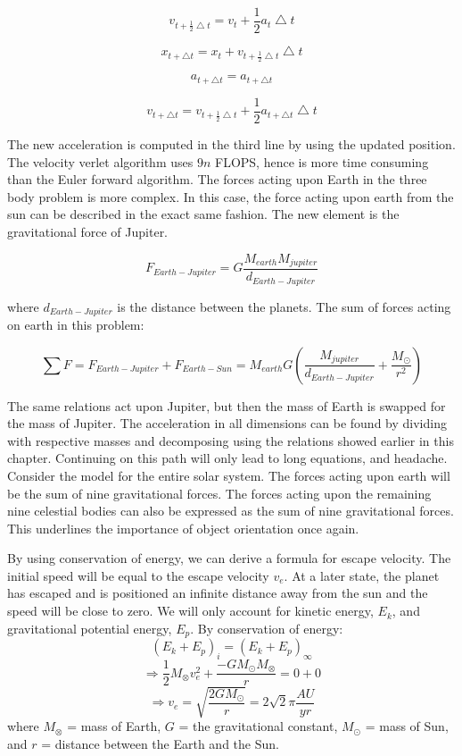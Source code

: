 \documentclass[10pt,a4paper]{article}
\begin{document}
$$v_{t+\frac{1}{2}\bigtriangleup t}=v_t + \frac{1}{2}a_t\bigtriangleup t$$

$$x_{t+\bigtriangleup t}=x_t + v_{t+\frac{1}{2}\bigtriangleup t}\bigtriangleup t $$

$$a_{t+\bigtriangleup t}=a_{t+\bigtriangleup t}$$

$$v_{t+\bigtriangleup t}=v_{t+\frac{1}{2}\bigtriangleup t} + \frac{1}{2}a_{t+\bigtriangleup t}\bigtriangleup t$$

\noindent The new acceleration is computed in the third line by using the updated position. The velocity verlet algorithm uses $9n$ FLOPS, hence is more time consuming than the Euler forward algorithm. The forces acting upon Earth in the three body problem is more complex. In this case, the force acting upon earth from the sun can be described in the exact same fashion. The new element is the gravitational force of Jupiter. 

$$F_{Earth-Jupiter}=G\frac{M_{earth}M_{jupiter}}{d_{Earth-Jupiter}}$$

\noindent where $d_{Earth-Jupiter}$ is the distance between the planets. The sum of forces acting on earth in this problem: 

$$\sum F = F_{Earth-Jupiter}+ F_{Earth-Sun}= M_{earth}G(\frac{M_{jupiter}}{d_{Earth-Jupiter}} + \frac{M_{\odot}}{r^2}) $$

\noindent The same relations act upon Jupiter, but then the mass of Earth is swapped for the mass of Jupiter. The acceleration in all dimensions can be found by dividing with respective masses and decomposing using the relations showed earlier in this chapter. Continuing on this path will only lead to long equations, and headache. Consider the model for the entire solar system. The forces acting upon earth will be the sum of nine gravitational forces. The forces acting upon the remaining nine celestial bodies can also be expressed as the sum of nine gravitational forces. This underlines the importance of object orientation once again.

\noindent By using conservation of energy, we can derive a formula for escape velocity. The initial speed will be equal to the escape velocity $v_e$. At a later state, the planet has escaped and is positioned an infinite distance away from the sun and the speed will be close to zero. We will only account for kinetic energy, $E_k$, and gravitational potential energy, $E_p$. By conservation of energy: 
$$(E_k+E_p)_i = (E_k+E_p)_{\infty}$$
$$\Rightarrow \frac{1}{2}M_{\otimes}v_e^2 + \frac{-GM_{\odot}M_{\otimes}}{r} = 0 + 0$$
$$\Rightarrow v_e = \sqrt{\frac{2GM_{\odot}}{r}} = 2\sqrt{2}\pi \frac{AU}{yr}$$
where $M_{\otimes}$ = mass of Earth, $G$ = the gravitational constant, $M_{\odot}$ = mass of Sun, and $r$ = distance between the Earth and the Sun.
\end{document}
